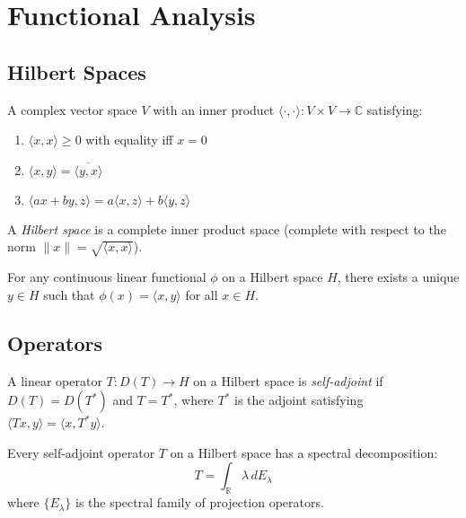 \section{Functional Analysis}

\subsection{Hilbert Spaces}

\begin{definition}
A complex vector space $V$ with an inner product $\langle \cdot, \cdot \rangle: V \times V \to \mathbb{C}$ satisfying:
\begin{enumerate}
\item $\langle x, x \rangle \geq 0$ with equality iff $x = 0$
\item $\langle x, y \rangle = \overline{\langle y, x \rangle}$
\item $\langle ax + by, z \rangle = a\langle x, z \rangle + b\langle y, z \rangle$
\end{enumerate}
\end{definition}

\begin{definition}
A \emph{Hilbert space} is a complete inner product space (complete with respect to the norm $\|x\| = \sqrt{\langle x, x \rangle}$).
\end{definition}

\begin{theorem}
For any continuous linear functional $\phi$ on a Hilbert space $H$, there exists a unique $y \in H$ such that $\phi(x) = \langle x, y \rangle$ for all $x \in H$.
\end{theorem}

\subsection{Operators}

\begin{definition}
A linear operator $T: D(T) \to H$ on a Hilbert space is \emph{self-adjoint} if $D(T) = D(T^*)$ and $T = T^*$, where $T^*$ is the adjoint satisfying $\langle Tx, y \rangle = \langle x, T^*y \rangle$.
\end{definition}

\begin{theorem}
Every self-adjoint operator $T$ on a Hilbert space has a spectral decomposition:
\[
T = \int_{\mathbb{R}} \lambda \, dE_{\lambda}
\]
where $\{E_{\lambda}\}$ is the spectral family of projection operators.
\end{theorem}

